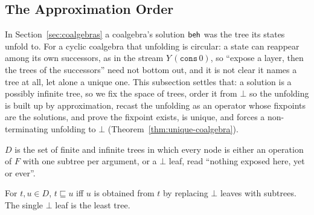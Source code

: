 \subsection{The Approximation Order}\label{sec:order}

In Section~\ref{sec:coalgebras} a coalgebra's solution $\mathsf{beh}$ was the tree its states unfold to. For a cyclic coalgebra that unfolding is circular: a state can reappear among its own successors, as in the stream $Y\,(\mathtt{cons}\,0)$, so ``expose a layer, then the trees of the successors'' need not bottom out, and it is not clear it names a tree at all, let alone a unique one. This subsection settles that: a solution is a possibly infinite tree, so we fix the space of trees, order it from $\bot$ so the unfolding is built up by approximation, recast the unfolding as an operator whose fixpoints are the solutions, and prove the fixpoint exists, is unique, and forces a non-terminating unfolding to $\bot$ (Theorem~\ref{thm:unique-coalgebra}).

\begin{definition}[Trees]\label{def:trees}
  $D$ is the set of finite and infinite trees in which every node is either an operation of
  $F$ with one subtree per argument, or a $\bot$ leaf, read ``nothing exposed here, yet or ever''.
\end{definition}

\begin{definition}\label{def:order}
  For $t, u \in D$, $t \sqsubseteq u$ iff $u$ is obtained from $t$ by replacing $\bot$ leaves with subtrees. The single $\bot$ leaf is the least tree.
\end{definition}

